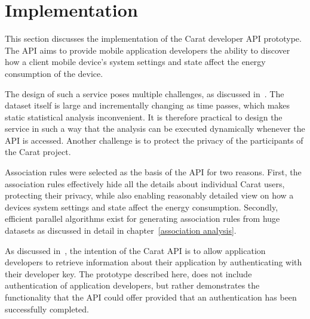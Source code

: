\section{Implementation}

This section discusses the implementation of the Carat developer API prototype. The API aims to provide mobile application developers the ability to discover how a client mobile device's system settings and state affect the energy consumption of the device.

The design of such a service poses multiple challenges, as discussed in~\cite{7840871}. The dataset itself is large and incrementally changing as time passes, which makes static statistical analysis inconvenient. It is therefore practical to design the service in such a way that the analysis can be executed dynamically whenever the API is accessed. Another challenge is to protect the privacy of the participants of the Carat project.

Association rules were selected as the basis of the API for two reasons. First, the association rules effectively hide all the details about individual Carat users, protecting their privacy, while also enabling reasonably detailed view on how a devices system settings and state affect the energy consumption. Secondly, efficient parallel algorithms exist for generating association rules from huge datasets as discussed in detail in chapter~\ref{association analysis}.

As discussed in~\cite{7840871}, the intention of the Carat API is to allow application developers to retrieve information about their application by authenticating with their developer key. The prototype described here, does not include authentication of application developers, but rather demonstrates the functionality that the API could offer provided that an authentication has been successfully completed. 

